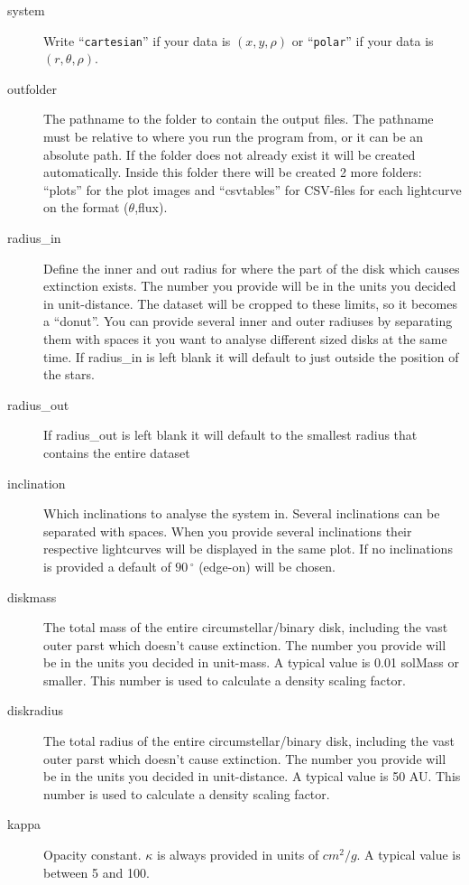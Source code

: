 \documentclass[a4paper, 12pt, english, titlepage]{article}
\newcommand{\degree}{\, ^\circ}    %
\begin{document}
\begin{description}
        \item[system]
            Write ``\texttt{cartesian}'' if your data is $(x,y,\rho)$ or ``\texttt{polar}'' if your data is $(r,\theta,\rho)$.
        \item[outfolder]
            The pathname to the folder to contain the output files. The pathname must be relative to where you run the program from, or it can be an absolute path. If the folder does not already exist it will be created automatically. Inside this folder there will be created 2 more folders: ``plots'' for the plot images and ``csvtables'' for CSV-files for each lightcurve on the format ($\theta$,flux).
        \item[radius\_in]
            Define the inner and out radius for where the part of the disk which causes extinction exists. The number you provide will be in the units you decided in unit-distance. The dataset will be cropped to these limits, so it becomes a ``donut''. You can provide several inner and outer radiuses by separating them with spaces it you want to analyse different sized disks at the same time. If radius\_in is left blank it will default to just outside the position of the stars.
        \item[radius\_out]
            If radius\_out is left blank it will default to the smallest radius that contains the entire dataset
        \item[inclination]
            Which inclinations to analyse the system in. Several inclinations can be separated with spaces. When you provide several inclinations their respective lightcurves will be displayed in the same plot. If no inclinations is provided a default of $90\degree$ (edge-on) will be chosen.
        \item[diskmass]
            The total mass of the entire circumstellar/binary disk, including the vast outer parst which doesn't cause extinction. The number you provide will be in the units you decided in unit-mass. A typical value is 0.01 solMass or smaller. This number is used to calculate a density scaling factor.
        \item[diskradius]
            The total radius of the entire circumstellar/binary disk, including the vast outer parst which doesn't cause extinction. The number you provide will be in the units you decided in unit-distance. A typical value is 50 AU. This number is used to calculate a density scaling factor.
        \item[kappa]
            Opacity constant. $\kappa$ is always provided in units of $cm^2 / g$. A typical value is between 5 and 100.

\end{description}
\end{document}
